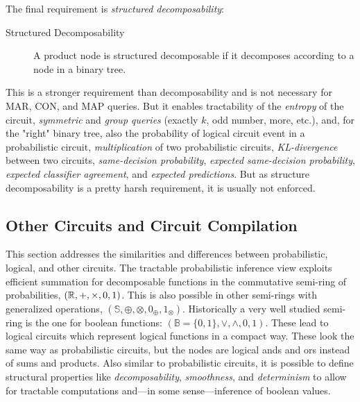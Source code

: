 			The final requirement is \emph{structured decomposability}:
			\begin{description}
				\item[Structured Decomposability] A product node is structured decomposable if it decomposes according to a node in a binary tree.
			\end{description}
			This is a stronger requirement than decomposability and is not necessary for MAR, CON, and MAP queries. But it enables tractability of the \emph{entropy} of the circuit, \emph{symmetric} and \emph{group queries} (exactly \(k\), odd number, more, etc.), and, for the "right" binary tree, also the probability of logical circuit event in a probabilistic circuit, \emph{multiplication} of two probabilistic circuits, \emph{KL-divergence} between two circuits, \emph{same-decision probability}, \emph{expected same-decision probability}, \emph{expected classifier agreement}, and \emph{expected predictions}. But as structure decomposability is a pretty harsh requirement, it is usually not enforced.

		\subsection{Other Circuits and Circuit Compilation}
			This section addresses the similarities and differences between probabilistic, logical, and other circuits. The tractable probabilistic inference view exploits efficient summation for decomposable functions in the commutative semi-ring of probabilities, \( (\mathbb{R}, +, \times, 0, 1) \). This is also possible in other semi-rings with generalized operations, \( (\mathbb{S}, \oplus, \otimes, 0_\oplus, 1_\otimes) \). Historically a very well studied semi-ring is the one for boolean functions: \( (\mathbb{B} = \{ 0, 1 \}, \lor, \land, 0, 1) \). These lead to logical circuits which represent logical functions in a compact way. These look the same way as probabilistic circuits, but the nodes are logical ands and ors instead of sums and products. Also similar to probabilistic circuits, it is possible to define structural properties like \emph{decomposability}, \emph{smoothness}, and \emph{determinism} to allow for tractable computations and---in some sense---inference of boolean values.


